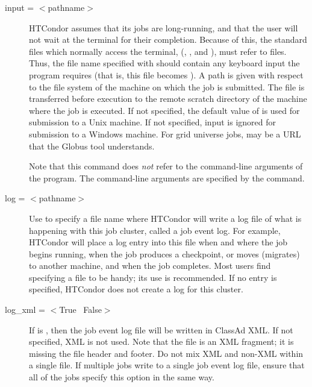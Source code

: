 \begin{description}
\label{man-condor-submit-input}
\item[input = $<$pathname$>$]
HTCondor assumes that its jobs are
long-running, and that the user will not wait at the terminal for their
completion. Because of this, the standard files which normally access
the terminal, (, , and ),
must refer to files. Thus,
the file name specified with  should contain any keyboard
input the program requires (that is, this file becomes ).
A path is given with respect to the file system of the machine
on which the job is submitted.
The file is transferred before execution
to the remote scratch directory of the machine where the job is executed. 
If not specified, the default value
of  is used for submission to a Unix machine.
If not specified, input is ignored
for submission to a Windows machine.
For grid universe jobs,  may be a URL that the Globus
tool  understands.

Note that this command does \emph{not} refer to the command-line
arguments of the program.  The command-line arguments are specified by
the  command.


\label{man-condor-submit-log}
\item[log = $<$pathname$>$] 
Use  to specify a file name where
HTCondor will write a log file of what is happening with this job cluster,
called a job event log.
For example, HTCondor will place a log entry into this file
when and where the job begins running,
when the job produces a checkpoint, or moves (migrates) to another machine,
and when the job completes.
Most users find specifying a  file to be handy;
its use is recommended. If no  entry is specified, 
HTCondor does not create a log for this cluster.


\label{man-condor-submit-log-xml}
\item[log\_xml = $<$True \Bar\ False$>$]
If  is , 
then the job event log file will be written in ClassAd XML.
If not specified, XML is not used.
Note that the file is an XML fragment; it is
missing the file header and footer.
Do not mix XML and non-XML within a single file.
If multiple jobs write to a
single job event log file, ensure that all of the jobs specify
this option in the same way.


\end{description}
